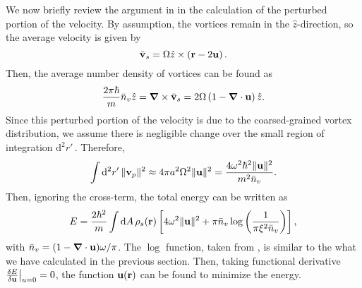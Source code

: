 \documentclass[onecolumn,nofootinbib,superscriptaddress]{revtex4}
\newcommand{\dd}[1]{\mathrm{d}#1\,}
\begin{document}
We now briefly review the argument in \cite{Sheehy:2004} in the calculation of the perturbed portion of the velocity.  By assumption, the vortices remain in the $\hat{z}$-direction, so the average velocity is given by
\begin{equation}
\bar{\bf v}_s = \Omega\hat{z}\times\left({\bf r} - 2 {\bf u}\right).
\end{equation}
Then, the average number density of vortices can be found as
\begin{equation}
\frac{2\pi \hbar}{m}\bar{n}_v \hat{z} = {\boldsymbol \nabla}\times \bar{\bf v}_s = 2\Omega\left(1-{\boldsymbol \nabla}\cdot {\bf u}\right)\hat{z}. \label{EQ:2dNv}
\end{equation}
Since this perturbed portion of the velocity is due to the coarsed-grained vortex distribution, we assume there is negligible change over the small region of integration $\dd{^2 r'}$.  Therefore,
\begin{equation}
\int \dd{^2 r'}\|{\bf v}_p\|^2 \approx 4 \pi a^2\Omega^2 \|{\bf u}\|^2 = \frac{4\omega^2\hbar^2 \|{\bf u}\|^2}{m^2\bar{n}_v}.
\end{equation}
Then, ignoring the cross-term, the total energy can be written as
\begin{equation}
E = \frac{2\hbar^2}{m}\int \dd{A} \rho_s({\bf r}) \left[4\omega^2\|{\bf u}\|^2 + \pi \bar{n}_v \log\left(\frac{1}{\pi \xi^2 \bar{n}_v}\right)\right],\label{EQ;2dTotEnergy}
\end{equation}
with $\bar{n}_v = (1-{\boldsymbol \nabla}\cdot {\bf u})\omega/\pi$.  The $\log$ function, taken from \cite{Sheehy:2004}, is similar to the what we have calculated in the previous section.  Then, taking functional derivative $\frac{\delta E}{\delta {\bf u}}\big|_{u=0} = 0$, the function ${\bf u}({\bf r})$ can be found to minimize the energy.
\end{document}
